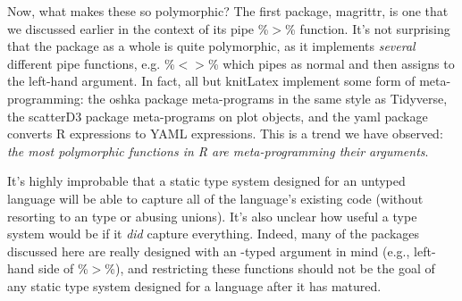 \documentclass[acmsmall,10pt,review,anonymous]{acmart}\settopmatter{printfolios=true,printccs=false,printacmref=false}
\begin{document}
Now, what makes these so polymorphic?
The first package, magrittr, is one that we discussed earlier in the context of its pipe \%$>$\% function. 
It's not surprising that the package as a whole is quite polymorphic, as it implements {\it several} different pipe functions, e.g. \%$<>$\% which pipes as normal and then assigns to the left-hand argument.
In fact, all but knitLatex implement some form of meta-programming:
the oshka package meta-programs in the same style as Tidyverse, the scatterD3 package meta-programs on plot objects, and the yaml package converts R expressions to YAML expressions.
This is a trend we have observed: {\it the most polymorphic functions in R are meta-programming their arguments}.

It's highly improbable that a static type system designed for an untyped language will be able to capture all of the language's existing code (without resorting to an \ANY type or abusing unions).
It's also unclear how useful a type system would be if it {\it did} capture everything.
Indeed, many of the packages discussed here are really designed with an \ANY-typed argument in mind (e.g., left-hand side of \%$>$\%), and restricting these functions should not be the goal of any static type system designed for a language after it has matured.

\end{document}
